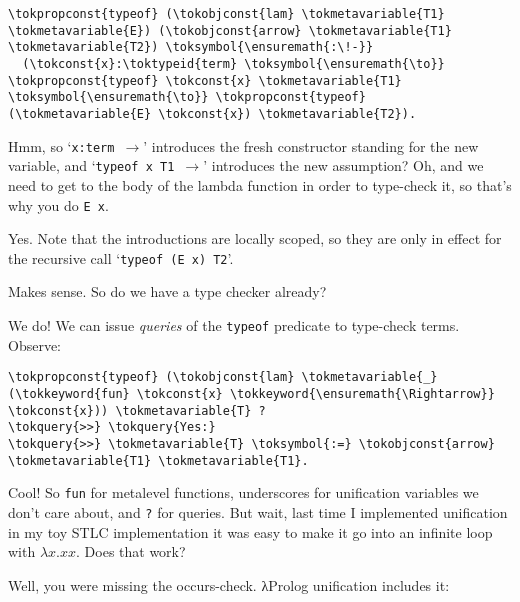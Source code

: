 \importantCodeblock{}

\begin{verbatim}
\tokpropconst{typeof} (\tokobjconst{lam} \tokmetavariable{T1} \tokmetavariable{E}) (\tokobjconst{arrow} \tokmetavariable{T1} \tokmetavariable{T2}) \toksymbol{\ensuremath{:\!-}}
  (\tokconst{x}:\toktypeid{term} \toksymbol{\ensuremath{\to}} \tokpropconst{typeof} \tokconst{x} \tokmetavariable{T1} \toksymbol{\ensuremath{\to}} \tokpropconst{typeof} (\tokmetavariable{E} \tokconst{x}) \tokmetavariable{T2}).
\end{verbatim}

\importantCodeblockEnd{}

\heroSTUDENT{} Hmm, so `\texttt{x:term\ \ensuremath{\to}}' introduces the fresh
constructor standing for the new variable, and
`\texttt{typeof\ x\ T1\ \ensuremath{\to}}' introduces the new assumption?
Oh, and we need to get to the body of the lambda function in order to
type-check it, so that's why you do \texttt{E\ x}.

\heroADVISOR{} Yes. Note that the introductions are locally scoped, so they
are only in effect for the recursive call `\texttt{typeof\ (E\ x)\ T2}'.

\heroSTUDENT{} Makes sense. So do we have a type checker already?

\heroADVISOR{} We do! We can issue \emph{queries} of the \texttt{typeof}
predicate to type-check terms. Observe:

\importantCodeblock{}

\begin{verbatim}
\tokpropconst{typeof} (\tokobjconst{lam} \tokmetavariable{_} (\tokkeyword{fun} \tokconst{x} \tokkeyword{\ensuremath{\Rightarrow}} \tokconst{x})) \tokmetavariable{T} ?
\tokquery{>>} \tokquery{Yes:}
\tokquery{>>} \tokmetavariable{T} \toksymbol{:=} \tokobjconst{arrow} \tokmetavariable{T1} \tokmetavariable{T1}.
\end{verbatim}

\importantCodeblockEnd{}

\heroSTUDENT{} Cool! So \texttt{fun} for metalevel functions, underscores for
unification variables we don't care about, and \texttt{?} for queries.
But wait, last time I implemented unification in my toy STLC
implementation it was easy to make it go into an infinite loop with
\(\lambda x. x x\). Does that work?

\heroADVISOR{} Well, you were missing the occurs-check. \foreignlanguage{greek}{λ}Prolog unification
includes it:

